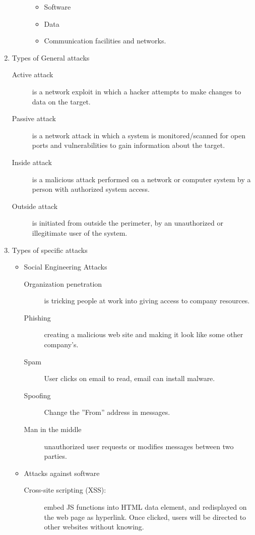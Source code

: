 \documentclass[a4paper]{article}
\begin{document}
\begin{enumerate}
\begin{description}
\begin{itemize}
						\item Software
						\item Data
						\item Communication facilities and networks.
					\end{itemize}
			\end{description}
		\item Types of General attacks
			\begin{description}
				\item[Active attack] is a network exploit in which a hacker attempts
					to make changes to data on the target.
				\item[Passive attack] is a network attack in which a system is
					monitored/scanned for open ports and vulnerabilities to gain
					information about the target.
				\item[Inside attack] is a malicious attack performed on a network or
					computer system by a person with authorized system access.
				\item[Outside attack] is initiated from outside the perimeter, by
					an unauthorized or illegitimate user of the system.
			\end{description}
		\item Types of specific attacks
			\begin{itemize}
				\item Social Engineering Attacks
					\begin{description}
						\item[Organization penetration] is tricking people at
							work into giving access to company resources.
						\item[Phishing] creating a malicious web site and 
							making it look like some other company's.
						\item[Spam] User clicks on email to read, email
							can install malware.
						\item[Spoofing] Change the ''From'' address in messages.
						\item[Man in the middle] unauthorized user requests
							or modifies messages between two parties.
					\end{description}
				\item Attacks against software
					\begin{description}
						\item[Cross-site scripting (XSS):] embed JS functions
							into HTML data element, and redisplayed on the
							web page as hyperlink. Once clicked, users will
							be directed to other websites without knowing.

\end{description}
\end{itemize}
\end{enumerate}
\end{document}
